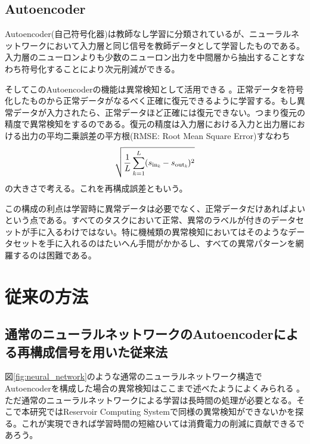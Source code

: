\documentclass[uplatex,a4paper,10pt]{jsarticle}
\begin{document}
\subsection{Autoencoder}
Autoencoder(自己符号化器)は教師なし学習に分類されているが、ニューラルネットワークにおいて入力層と同じ信号を教師データとして学習したものである。入力層のニューロンよりも少数のニューロン出力を中間層から抽出することすなわち符号化することにより次元削減ができる\cite{autoencoder}。 

そしてこのAutoencoderの機能は異常検知として活用できる \cite{ad_by_autoencoder_space} \cite{ad_by_autoencoder_space_in_japanese} \cite{ad_by_autoencoder_machine_in_japanese}。正常データを符号化したものから正常データがなるべく正確に復元できるように学習する。もし異常データが入力されたら、正常データほど正確には復元できない。つまり復元の精度で異常検知をするのである。復元の精度は入力層における入力と出力層における出力の平均二乗誤差の平方根(RMSE: Root Mean Square Error)すなわち
\begin{equation}
    \displaystyle \sqrt{\frac{1}{L}\sum_{k=1}^{L}(s_{\rm{in}_{\textit{k}}} - s_{\rm{out}_{\textit{k}}})^2}
\end{equation}
の大きさで考える。これを再構成誤差ともいう。

この構成の利点は学習時に異常データは必要でなく、正常データだけあればよいという点である。すべてのタスクにおいて正常、異常のラベルが付きのデータセットが手に入るわけではない。特に機械類の異常検知においてはそのようなデータセットを手に入れるのはたいへん手間がかかるし、すべての異常パターンを網羅するのは困難である。

\section{従来の方法}

\subsection{通常のニューラルネットワークのAutoencoderによる再構成信号を用いた従来法}
図\ref{fig:neural_network}のような通常のニューラルネットワーク構造でAutoencoderを構成した場合の異常検知はここまで述べたようによくみられる\cite{ad_by_autoencoder_space} \cite{ad_by_autoencoder_space_in_japanese} \cite{ad_by_autoencoder_machine_in_japanese}。ただ通常のニューラルネットワークによる学習は長時間の処理が必要となる。そこで本研究ではReservoir Computing Systemで同様の異常検知ができないかを探る。これが実現できれば学習時間の短縮ひいては消費電力の削減に貢献できるであろう。
\end{document}
